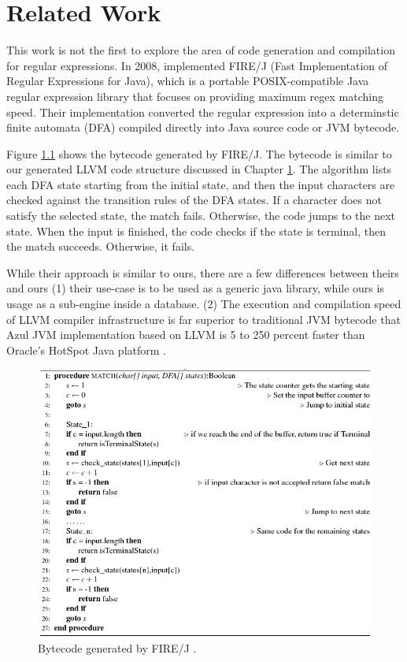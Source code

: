 \chapter{Related Work}\label{chapter:related_work}
This work is not the first to explore the area of code generation and compilation for regular expressions. In 2008, \citet{firejpaper} implemented FIRE/J (Fast Implementation of Regular Expressions for Java), which is a portable POSIX-compatible Java regular expression library that focuses on providing maximum regex matching speed. Their implementation converted the regular expression into a determinstic finite automata (DFA) compiled directly into Java source code or JVM bytecode.

Figure \ref{fig:firejpaper} shows the bytecode generated by FIRE/J. The bytecode is similar to our generated LLVM code structure discussed in Chapter \ref{chapter:related_work}. The algorithm lists each DFA state starting from the initial state, and then the input characters are checked against the transition rules of the DFA states. If a character does not satisfy the selected state, the match fails. Otherwise, the code jumps to the next state. When the input is finished, the code checks if the state is terminal, then the match succeeds. Otherwise, it fails.

While their approach is similar to ours, there are a few differences between theirs and ours (1) their use-case is to be used as a generic java library, while ours is usage as a sub-engine inside a database. (2) The execution and compilation speed of LLVM compiler infrastructure is far superior to traditional JVM bytecode that Azul JVM implementation based on LLVM is 5 to 250 percent faster than Oracle's HotSpot Java platform \cite{azul}.

\begin{figure}[htbp]
\includegraphics[width=\textwidth]{imgs/alg-byte-firej.png}
\caption{Bytecode generated by FIRE/J \cite{firejpaper}.}\label{fig:firejpaper}
\end{figure}

